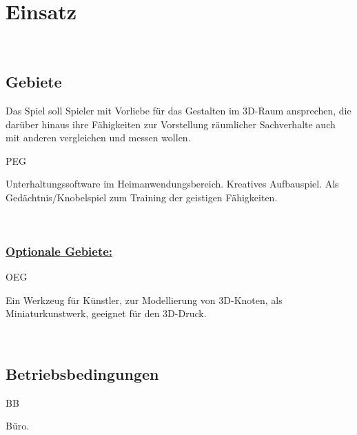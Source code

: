 %
%


\chapter{Einsatz}
\label{ES}~\\


\section{Gebiete}
\label{ES:Gebiete}

Das Spiel soll Spieler mit Vorliebe für das Gestalten im 3D-Raum ansprechen, die darüber hinaus ihre Fähigkeiten zur Vorstellung räumlicher Sachverhalte auch mit anderen vergleichen und messen wollen.\\



\begin{ids}{\gls{PEG}}

	\id[10] Unterhaltungssoftware im Heimanwendungsbereich.
	\id[20] Kreatives Aufbauspiel.
	\id[30] Als Gedächtnis/Knobelspiel zum Training der geistigen Fähigkeiten.

\end{ids}

~\\


\subsection*{\underline{Optionale Gebiete:}}

\begin{ids}{\gls{OEG}}

	\id[10] Ein Werkzeug für Künstler, zur Modellierung von 3D-Knoten, als Miniaturkunstwerk, geeignet für den 3D-Druck.

\end{ids}


%
%
~\\

\section{Betriebsbedingungen}
\label{ES:BB}

\begin{ids}{\gls{BB}}

	\id[10] Büro.

\end{ids}


